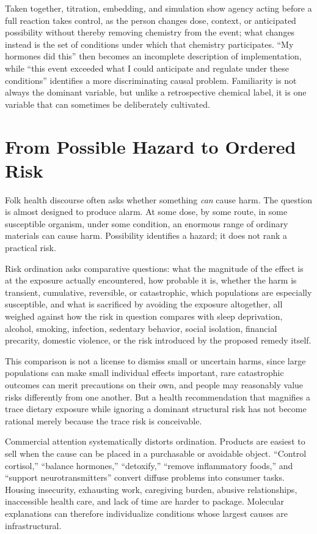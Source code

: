 \documentclass[11pt]{article}
\begin{document}
Taken together, titration, embedding, and simulation show agency acting before a full reaction takes control, as the person changes dose, context, or anticipated possibility without thereby removing chemistry from the event; what changes instead is the set of conditions under which that chemistry participates. ``My hormones did this'' then becomes an incomplete description of implementation, while ``this event exceeded what I could anticipate and regulate under these conditions'' identifies a more discriminating causal problem. Familiarity is not always the dominant variable, but unlike a retrospective chemical label, it is one variable that can sometimes be deliberately cultivated.

\section{From Possible Hazard to Ordered Risk}

Folk health discourse often asks whether something \emph{can} cause harm. The question is almost designed to produce alarm. At some dose, by some route, in some susceptible organism, under some condition, an enormous range of ordinary materials can cause harm. Possibility identifies a hazard; it does not rank a practical risk.

Risk ordination asks comparative questions: what the magnitude of the effect is at the exposure actually encountered, how probable it is, whether the harm is transient, cumulative, reversible, or catastrophic, which populations are especially susceptible, and what is sacrificed by avoiding the exposure altogether, all weighed against how the risk in question compares with sleep deprivation, alcohol, smoking, infection, sedentary behavior, social isolation, financial precarity, domestic violence, or the risk introduced by the proposed remedy itself.

This comparison is not a license to dismiss small or uncertain harms, since large populations can make small individual effects important, rare catastrophic outcomes can merit precautions on their own, and people may reasonably value risks differently from one another. But a health recommendation that magnifies a trace dietary exposure while ignoring a dominant structural risk has not become rational merely because the trace risk is conceivable.

Commercial attention systematically distorts ordination. Products are easiest to sell when the cause can be placed in a purchasable or avoidable object. ``Control cortisol,'' ``balance hormones,'' ``detoxify,'' ``remove inflammatory foods,'' and ``support neurotransmitters'' convert diffuse problems into consumer tasks. Housing insecurity, exhausting work, caregiving burden, abusive relationships, inaccessible health care, and lack of time are harder to package. Molecular explanations can therefore individualize conditions whose largest causes are infrastructural.
\end{document}
